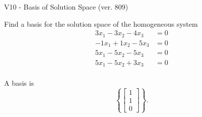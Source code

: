 \begin{exercise}
  \begin{exerciseTitle}V10 - Basis of Solution Space (ver. 809)\end{exerciseTitle}
  \begin{exerciseStatement}
    Find a basis for the solution space of the homogeneous system 
\begin{align*}
 3 x_ 1 -3 x_ 2 -4 x_ 3 &= 0  \\ 
  -1 x_ 1 + 1 x_ 2 -5 x_ 3 &= 0  \\ 
  5 x_ 1 -5 x_ 2 -5 x_ 3 &= 0  \\ 
  5 x_ 1 -5 x_ 2 + 3 x_ 3 &= 0  \\ 
 \end{align*}


 
  \end{exerciseStatement}

  \begin{exerciseAnswer}
   A basis is   
\[\left\{\left[\begin{array}{c}
1 \\
1 \\
0
\end{array}\right]\right\}.\]

  


  \end{exerciseAnswer}
\end{exercise}